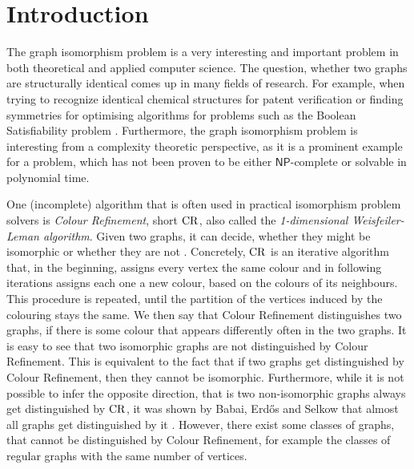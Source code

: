 \section{Introduction}

The graph isomorphism problem is a very interesting and important problem in both theoretical and applied computer science.
The question, whether two graphs are structurally identical comes up in many fields of research.
For example, when trying to recognize identical chemical structures for patent verification \cite{ray1957FindingChemical} or finding symmetries for optimising algorithms for problems such as the Boolean Satisfiability problem \cite{grohe2020GraphIsomorphism}.
Furthermore, the graph isomorphism problem is interesting from a complexity theoretic perspective, as it is a prominent example for a problem, which has not been proven to be either $\mathsf{NP}$-complete or solvable in polynomial time. \cite{babai2016GraphIsomorphism}

One (incomplete) algorithm that is often used in practical isomorphism problem solvers \cite{grohe2020GraphIsomorphism} is \emph{Colour Refinement}, short $\operatorname{CR}$, also called the \emph{1-dimensional Weisfeiler-Leman algorithm}.
Given two graphs, it can decide, whether they might be isomorphic or whether they are not \cite{berkholz2017TightLowera}.
Concretely, $\operatorname{CR}$ is an iterative algorithm that, in the beginning, assigns every vertex the same colour and in following iterations assigns each one a new colour, based on the colours of its neighbours.
This procedure is repeated, until the partition of the vertices induced by the colouring stays the same. 
We then say that Colour Refinement distinguishes two graphs, if there is some colour that appears differently often in the two graphs.
It is easy to see that two isomorphic graphs are not distinguished by Colour Refinement.
This is equivalent to the fact that if two graphs get distinguished by Colour Refinement, then they cannot be isomorphic.
Furthermore, while it is not possible to infer the opposite direction, that is two non-isomorphic graphs always get distinguished by $\operatorname{CR}$, it was shown by Babai, Erd\H{o}s and Selkow that almost all graphs get distinguished by it \cite{babai1980RandomGraph}.
However, there exist some classes of graphs, that cannot be distinguished by Colour Refinement, for example the classes of regular graphs with the same number of vertices.


